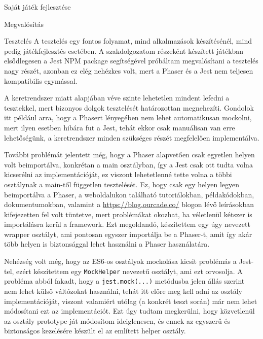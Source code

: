 \begin{MyChapter}{Saját játék fejlesztése}
\begin{MySection}{Megvalósítás}
	\end{MySection}
	
	\begin{MySection}{Tesztelés}
		A tesztelés egy fontos folyamat, mind alkalmazások készítésénél, mind pedig játékfejlesztés esetében. 
		A szakdolgozatom részeként készített játékban elsődlegesen a Jest NPM package segítségével próbáltam megvalósítani a tesztelés nagy részét, azonban ez elég nehézkes volt, mert a Phaser és a Jest nem teljesen kompatibilis egymással.
				
		
		A keretrendszer miatt alapjában véve szinte lehetetlen mindent lefedni a tesztekkel, mert bizonyos dolgok tesztelését határozottan megnehezíti.
		Gondolok itt például arra, hogy a Phasert lényegében nem lehet automatikusan mockolni, mert ilyen esetben hibára fut a Jest, tehát ekkor csak manuálisan van erre lehetőségünk, a keretrendszer minden szükséges részét megfelelően implementálva.
		
		További problémát jelentett még, hogy a Phaser alapvetően csak egyetlen helyen volt beimportálva, konkrétan a main osztályban, így a Jest csak ott tudta volna kicserélni az implementációját, ez viszont lehetetlenné tette volna a többi osztálynak a main-től független tesztelését. Ez, hogy csak egy helyen legyen beimportálva a Phaser, a weboldalukon \cite{phaser_official_website} található tutoriálokban, példakódokban, dokumentumokban, valamint a \url{https://blog.ourcade.co/} blogon lévő leírásokban kifejezetten fel volt tüntetve, mert problémákat okozhat, ha véletlenül kétszer is importálásra kerül a framework. Ezt megoldandó, készítettem egy úgy nevezett wrapper osztályt, ami pontosan egyszer importálja be a Phaser-t, amit így akár több helyen is biztonsággal lehet használni a Phaser használatára.
		
			
		Nehézség volt még, hogy az ES6-os osztályok mockolása kicsit problémás a Jest-tel, ezért készítettem egy \texttt{MockHelper} nevezetű osztályt, ami ezt orvosolja. A probléma abból fakadt, hogy a \texttt{jest.mock(...)} metódusba jelen állás szerint nem lehet külső váltózokat használni, tehát itt előre meg kell adni az osztály implementációját, viszont valamiért utólag (a konkrét teszt során) már nem lehet módosítani ezt az implementációt. Ezt úgy tudtam megkerülni, hogy közvetlenül az osztály prototype-ját módosítom ideiglenesen, és ennek az egyszerű és biztonságos kezelésére készült el az említett helper osztály.		


\end{MySection}
\end{MyChapter}
